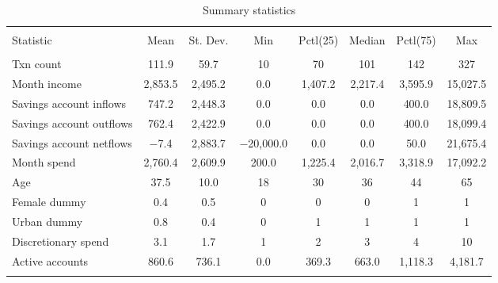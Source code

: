 
\begin{table}[H] \centering 
  \caption{Summary statistics} 
  \label{tab:sumstats} 
\footnotesize 
\begin{tabular}{@{\extracolsep{5pt}}lccccccc} 
\\[-1.8ex]\hline 
\hline \\[-1.8ex] 
Statistic & \multicolumn{1}{c}{Mean} & \multicolumn{1}{c}{St. Dev.} & \multicolumn{1}{c}{Min} & \multicolumn{1}{c}{Pctl(25)} & \multicolumn{1}{c}{Median} & \multicolumn{1}{c}{Pctl(75)} & \multicolumn{1}{c}{Max} \\ 
\hline \\[-1.8ex] 
Txn count & 111.9 & 59.7 & 10 & 70 & 101 & 142 & 327 \\ 
Month income & 2,853.5 & 2,495.2 & 0.0 & 1,407.2 & 2,217.4 & 3,595.9 & 15,027.5 \\ 
Savings account inflows & 747.2 & 2,448.3 & 0.0 & 0.0 & 0.0 & 400.0 & 18,809.5 \\ 
Savings account outflows & 762.4 & 2,422.9 & 0.0 & 0.0 & 0.0 & 400.0 & 18,099.4 \\ 
Savings account netflows & $-$7.4 & 2,883.7 & $-$20,000.0 & 0.0 & 0.0 & 50.0 & 21,675.4 \\ 
Month spend & 2,760.4 & 2,609.9 & 200.0 & 1,225.4 & 2,016.7 & 3,318.9 & 17,092.2 \\ 
Age & 37.5 & 10.0 & 18 & 30 & 36 & 44 & 65 \\ 
Female dummy & 0.4 & 0.5 & 0 & 0 & 0 & 1 & 1 \\ 
Urban dummy & 0.8 & 0.4 & 0 & 1 & 1 & 1 & 1 \\ 
Discretionary spend & 3.1 & 1.7 & 1 & 2 & 3 & 4 & 10 \\ 
Active accounts & 860.6 & 736.1 & 0.0 & 369.3 & 663.0 & 1,118.3 & 4,181.7 \\ 
\hline \\[-1.8ex] 
\end{tabular} 
\end{table} 
